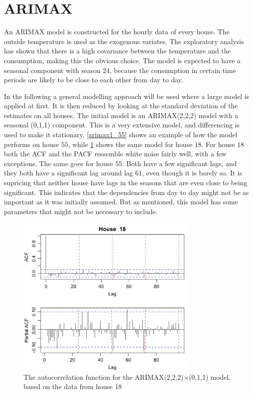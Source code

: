 \section{ARIMAX}
An ARIMAX model is constructed for the hourly data of every house. The outside temperature is used as the exogenous variates. The exploratory analysis has shown that there is a high covariance between the temperature and the consumption, making this the obvious choice. The model is expected to have a seasonal component with season 24, because the consumption in certain time periods are likely to be close to each other from day to day.

\noindent In the following a general modelling approach will be used where a large model is applied at first. It is then reduced by looking at the standard deviation of the estimates on all houses. The initial model is an ARIMAX(2,2,2) model with a seasonal (0,1,1) component. This is a very extensive model, and differencing is used to make it stationary. \cref{arimax1_55} shows an example of how the model performs on house $55$, while \cref{arimax1_18} shows the same model for house $18$. For house $18$ both the ACF and the PACF ressemble white noise fairly well, with a few exceptions. The same goes for house $55$. Both have a few significant lags, and they both have a significant lag around lag $61$, even though it is barely so. It is supricing that neither house have lags in the seasons that are even close to being significant. This indicates that the dependencies from day to day might not be as important as it was initially assumed. But as mentioned, this model has some parameters that might not be necessary to include.




\begin{figure}
    \centering
    \includegraphics[width=0.8\textwidth]{../../../figures/arimax/Arimax1_18.jpeg}
    \caption{The autocorrelation function for the ARIMAX(2,2,2)$\times$(0,1,1) model, based on the data from house 18}
    \label{arimax1_18}
\end{figure}


